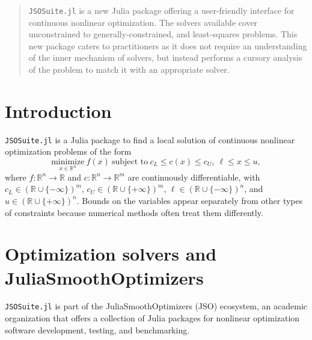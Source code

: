 \documentclass{juliacon}
\begin{document}


\maketitle

\begin{abstract}

\texttt{JSOSuite.jl} is a new Julia package offering a user-friendly interface for continuous nonlinear optimization.
The solvers available cover unconstrained to generally-constrained, and least-squares problems.
This new package caters to practitioners as it does not require an understanding of the inner mechanism of solvers, but instead performs a cursory analysis of the problem to match it with an appropriate solver.

\end{abstract}

\section{Introduction}

\texttt{JSOSuite.jl} is a Julia \cite{bezanson2017julia} package to find a local solution of continuous nonlinear optimization problems of the form
\begin{equation}\label{eq:nlp}
    \underset{x \in \mathbb{R}^{n}}{\text{minimize}} \ f(x) \ \text{subject to} \ c_L \leq c(x)  \leq c_U, \ \ell \leq x \leq u,
\end{equation}
where \(f:\mathbb{R}^n\to\mathbb{R}\) and  \(c:\mathbb{R}^n\to\mathbb{R}^m\) are continuously differentiable, with \(c_L \in \left(\mathbb{R} \cup \{-\infty\} \right)^{m}\),  \(c_U \in \left(\mathbb{R} \cup \{+\infty\} \right)^{m}\),  \(\ell \in \left(\mathbb{R} \cup \{-\infty\} \right)^n\), and  \(u \in \left(\mathbb{R} \cup \{+\infty\} \right)^n\).
Bounds on the variables appear separately from other types of constraints because numerical methods often treat them differently.

\section{Optimization solvers and JuliaSmoothOptimizers}

\texttt{JSOSuite.jl} is part of the JuliaSmoothOptimizers (JSO) ecosystem, %
an academic organization that offers a collection of Julia packages for nonlinear optimization software development, testing, and benchmarking.
\end{document}
